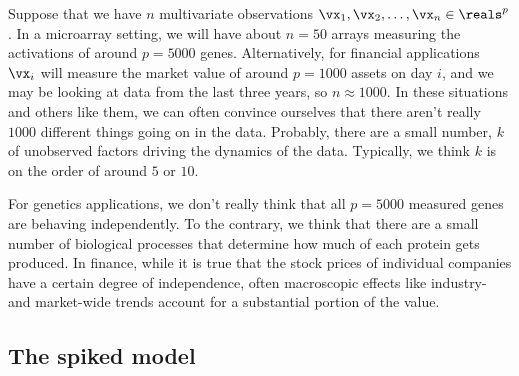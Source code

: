 Suppose that we have $n$ multivariate observations $\vx_{1}, \vx_{2}, \ldots, \vx_{n} \in \reals^p$.  In a microarray setting, we will have about $n=50$ arrays measuring the activations of around $p=5000$ genes.  Alternatively, for financial applications $\vx_i$ will measure the market value of around $p=1000$ assets on day $i$, and we may be looking at data from the last three years, so $n \approx 1000$.  In these situations and others like them, we can often convince ourselves that there aren't really $1000$ different things going on in the data.  Probably, there are a small number, $k$ of unobserved factors driving the dynamics of the data.  Typically, we think $k$ is on the order of around $5$ or $10$.

For genetics applications, we don't really think that all $p=5000$ measured genes are behaving independently.  To the contrary, we think that there are a small number of biological processes that determine how much of each protein gets produced.  In finance, while it is true that the stock prices of individual companies have a certain degree of independence, often macroscopic effects like industry- and market-wide trends account for a substantial portion of the value.

\subsection{The spiked model}

